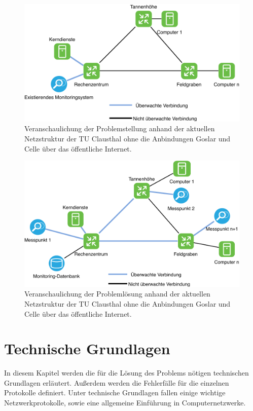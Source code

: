 \documentclass[titlepage]{report}
\begin{document}
\begin{figure}[H]
    \centering
    \includegraphics[width=1.0\textwidth]{figures/problemstellung.pdf}
    \caption{Veranschaulichung der Problemstellung anhand der aktuellen
    Netzstruktur der TU Clausthal ohne die Anbindungen Goslar und Celle
    über das öffentliche Internet.}\label{fig:problemstellung}
\end{figure}
\begin{figure}[H]
    \centering
    \includegraphics[width=1.0\textwidth]{figures/problemloesung.pdf}
    \caption{Veranschaulichung der Problemlösung anhand der aktuellen
    Netzstruktur der TU Clausthal ohne die Anbindungen Goslar und Celle
    über das öffentliche Internet.}\label{fig:problemloesung}
\end{figure}
\chapter{Technische Grundlagen}
In diesem Kapitel werden die für die Lösung des Problems nötigen
technischen Grundlagen erläutert. Außerdem werden die Fehlerfälle für
die einzelnen Protokolle definiert. Unter technische Grundlagen fallen
einige wichtige Netzwerkprotokolle, sowie eine allgemeine Einführung in
Computernetzwerke.
\end{document}
